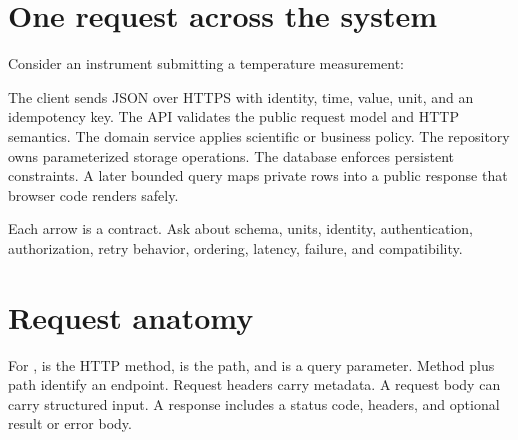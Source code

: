 \section{One request across the system}

Consider an instrument submitting a temperature measurement:

\begin{center}
\end{center}

The client sends JSON over HTTPS with identity, time, value, unit, and an
idempotency key. The API validates the public request model and HTTP semantics.
The domain service applies scientific or business policy. The repository owns
parameterized storage operations. The database enforces persistent constraints.
A later bounded query maps private rows into a public response that browser code
renders safely.

Each arrow is a contract. Ask about schema, units, identity, authentication,
authorization, retry behavior, ordering, latency, failure, and compatibility.

\section{Request anatomy}

For ,  is the HTTP
method,  is the path, and  is a
query parameter. Method plus path identify an endpoint. Request headers carry
metadata. A request body can carry structured input. A response includes a
status code, headers, and optional result or error body.

